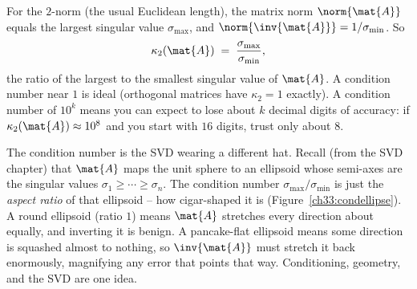 \begin{formalbox}
For the $2$-norm (the usual Euclidean length), the matrix norm $\norm{\mat{A}}$ equals
the largest singular value $\sigma_{\max}$, and $\norm{\inv{\mat{A}}} = 1/\sigma_{\min}$.
So
\[
  \kappa_2(\mat{A}) \;=\; \frac{\sigma_{\max}}{\sigma_{\min}},
\]
the ratio of the largest to the smallest singular value of $\mat{A}$. A condition
number near $1$ is ideal (orthogonal matrices have $\kappa_2 = 1$ exactly). A condition
number of $10^{k}$ means you can expect to lose about $k$ decimal digits of accuracy:
if $\kappa_2(\mat{A})\approx 10^{8}$ and you start with $16$ digits, trust only about
$8$.
\end{formalbox}

\begin{connectionbox}
The condition number is the SVD wearing a different hat. Recall (from the SVD chapter)
that $\mat{A}$ maps the unit sphere to an ellipsoid whose semi-axes are the singular
values $\sigma_1\ge\cdots\ge\sigma_n$. The condition number $\sigma_{\max}/\sigma_{\min}$
is just the \emph{aspect ratio} of that ellipsoid -- how cigar-shaped it is
(Figure~\ref{ch33:condellipse}). A round
ellipsoid (ratio $1$) means $\mat{A}$ stretches every direction about equally, and
inverting it is benign. A pancake-flat ellipsoid means some direction is squashed
almost to nothing, so $\inv{\mat{A}}$ must stretch it back enormously, magnifying any
error that points that way. Conditioning, geometry, and the SVD are one idea.
\end{connectionbox}

